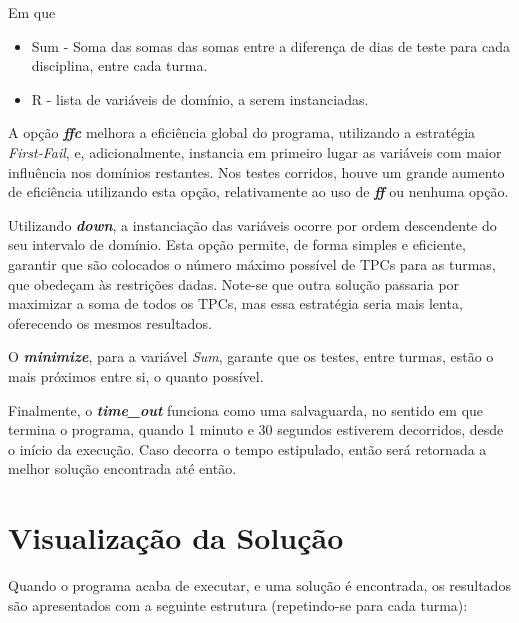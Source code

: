 \documentclass{llncs}
\begin{document}
Em que
\begin{itemize}
\item Sum - Soma das somas das somas entre a diferença de dias de teste para cada disciplina, entre cada turma.
\item R - lista de variáveis de domínio, a serem instanciadas.
\end{itemize}
 
A opção \textit{\textbf{ffc}} melhora a eficiência global do programa, utilizando a estratégia \textit{First-Fail}, e, adicionalmente, instancia em primeiro lugar as variáveis com maior influência nos domínios restantes. Nos testes corridos, houve um grande aumento de eficiência utilizando esta opção, relativamente ao uso de \textit{\textbf{ff}} ou nenhuma opção.\par
Utilizando \textit{\textbf{down}}, a instanciação das variáveis ocorre por ordem descendente do seu intervalo de domínio. Esta opção permite, de forma simples e eficiente, garantir que são colocados o número máximo possível de TPCs para as turmas, que obedeçam às restrições dadas. Note-se que outra solução passaria por maximizar a soma de todos os TPCs, mas essa estratégia seria mais lenta, oferecendo os mesmos resultados.\par
O \textit{\textbf{minimize}}, para a variável \textit{Sum}, garante que os testes, entre turmas, estão o mais próximos entre si, o quanto possível.\par
Finalmente, o \textit{\textbf{time\_out}} funciona como uma salvaguarda, no sentido em que termina o programa, quando 1 minuto e 30 segundos estiverem decorridos, desde o início da execução. Caso decorra o tempo estipulado, então será retornada a melhor solução encontrada até então.


\newpage
\section{Visualização da Solução}
Quando o programa acaba de executar, e uma solução é encontrada, os resultados são apresentados com a seguinte estrutura (repetindo-se para cada turma):\\
\end{document}
